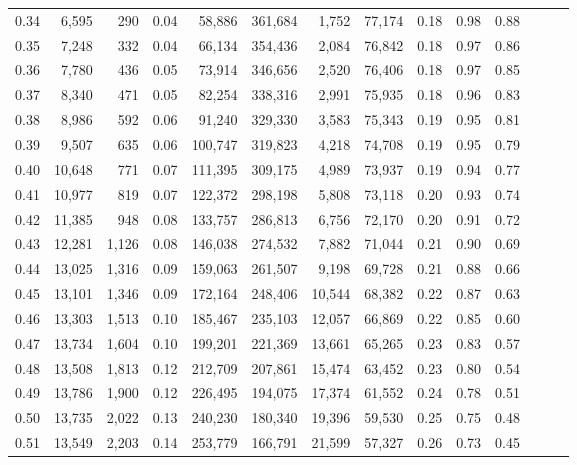 \begin{tabular}{rrrrrrrrrrrrrr}
0.34 &   6,595 &    290 &  0.04 &   58,886 &  361,684 &   1,752 &  77,174 &  0.18 &  0.98 &      0.88 \\
0.35 &   7,248 &    332 &  0.04 &   66,134 &  354,436 &   2,084 &  76,842 &  0.18 &  0.97 &      0.86 \\
0.36 &   7,780 &    436 &  0.05 &   73,914 &  346,656 &   2,520 &  76,406 &  0.18 &  0.97 &      0.85 \\
0.37 &   8,340 &    471 &  0.05 &   82,254 &  338,316 &   2,991 &  75,935 &  0.18 &  0.96 &      0.83 \\
0.38 &   8,986 &    592 &  0.06 &   91,240 &  329,330 &   3,583 &  75,343 &  0.19 &  0.95 &      0.81 \\
0.39 &   9,507 &    635 &  0.06 &  100,747 &  319,823 &   4,218 &  74,708 &  0.19 &  0.95 &      0.79 \\
0.40 &  10,648 &    771 &  0.07 &  111,395 &  309,175 &   4,989 &  73,937 &  0.19 &  0.94 &      0.77 \\
0.41 &  10,977 &    819 &  0.07 &  122,372 &  298,198 &   5,808 &  73,118 &  0.20 &  0.93 &      0.74 \\
0.42 &  11,385 &    948 &  0.08 &  133,757 &  286,813 &   6,756 &  72,170 &  0.20 &  0.91 &      0.72 \\
0.43 &  12,281 &  1,126 &  0.08 &  146,038 &  274,532 &   7,882 &  71,044 &  0.21 &  0.90 &      0.69 \\
0.44 &  13,025 &  1,316 &  0.09 &  159,063 &  261,507 &   9,198 &  69,728 &  0.21 &  0.88 &      0.66 \\
0.45 &  13,101 &  1,346 &  0.09 &  172,164 &  248,406 &  10,544 &  68,382 &  0.22 &  0.87 &      0.63 \\
0.46 &  13,303 &  1,513 &  0.10 &  185,467 &  235,103 &  12,057 &  66,869 &  0.22 &  0.85 &      0.60 \\
0.47 &  13,734 &  1,604 &  0.10 &  199,201 &  221,369 &  13,661 &  65,265 &  0.23 &  0.83 &      0.57 \\
0.48 &  13,508 &  1,813 &  0.12 &  212,709 &  207,861 &  15,474 &  63,452 &  0.23 &  0.80 &      0.54 \\
0.49 &  13,786 &  1,900 &  0.12 &  226,495 &  194,075 &  17,374 &  61,552 &  0.24 &  0.78 &      0.51 \\
0.50 &  13,735 &  2,022 &  0.13 &  240,230 &  180,340 &  19,396 &  59,530 &  0.25 &  0.75 &      0.48 \\
0.51 &  13,549 &  2,203 &  0.14 &  253,779 &  166,791 &  21,599 &  57,327 &  0.26 &  0.73 &      0.45 \\

\end{tabular}
